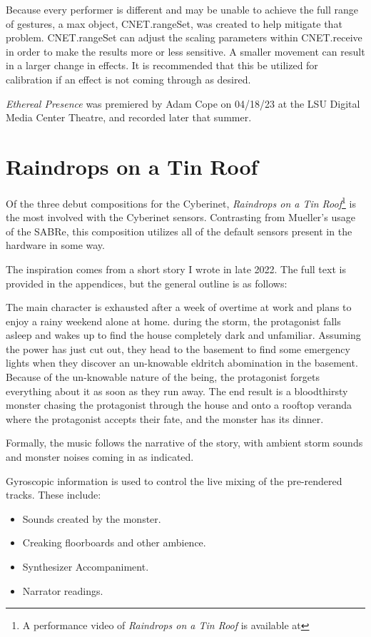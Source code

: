 Because every performer is different and may be unable to achieve the full range of gestures, a max object, CNET.rangeSet, was created to help mitigate that problem. CNET.rangeSet can adjust the scaling parameters within CNET.receive in order to make the results more or less sensitive. A smaller movement can result in a larger change in effects. It is recommended that this be utilized for calibration if an effect is not coming through as desired.


\textit{Ethereal Presence} was premiered by Adam Cope on 04/18/23 at the LSU Digital Media Center Theatre, and recorded later that summer.

\section{Raindrops on a Tin Roof}
Of the three debut compositions for the Cyberinet, \textit{Raindrops on a Tin Roof}\footnote{A performance video of \textit{Raindrops on a Tin Roof} is available at} is the most involved with the Cyberinet sensors. Contrasting from Mueller's usage of the SABRe, this composition utilizes all of the default sensors present in the hardware in some way. 

The inspiration comes from a short story I wrote in late 2022. The full text is provided in the appendices, but the general outline is as follows:

The main character is exhausted after a week of overtime at work and plans to enjoy a rainy weekend alone at home. during the storm, the protagonist falls asleep and wakes up to find the house completely dark and unfamiliar. Assuming the power has just cut out, they head to the basement to find some emergency lights when they discover an un-knowable eldritch abomination in the basement. Because of the un-knowable nature of the being, the protagonist forgets everything about it as soon as they run away. The end result is a bloodthirsty monster chasing the protagonist through the house and onto a rooftop veranda where the protagonist accepts their fate, and the monster has its dinner.

Formally, the music follows the narrative of the story, with ambient storm sounds and monster noises coming in as indicated. 

Gyroscopic information is used to control the live mixing of the pre-rendered tracks. These include:
\begin{itemize}
    \item Sounds created by the monster.
    \item Creaking floorboards and other ambience.
    \item Synthesizer Accompaniment.
    \item Narrator readings.
\end{itemize}

